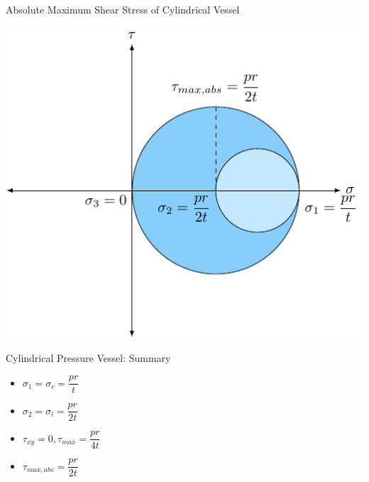 \documentclass[10pt, svgnames]{beamer}
\begin{document}
\begin{frame}[label={sec:org0fff3af}]{Absolute Maximum Shear Stress of Cylindrical Vessel}
\begin{center}
\includegraphics[height=0.8\textheight]{pictures/abs-max-shear-cyl-vessel.pdf}
\end{center}
\end{frame}

\begin{frame}[label={sec:orgfecb9f8}]{Cylindrical Pressure Vessel: Summary}
\begin{itemize}
\item \(\sigma_1 = \sigma_c = \dfrac{pr}{t}\)
\item \(\sigma_2 = \sigma_l = \dfrac{pr}{2t}\)
\item \(\tau_{xy} = 0, \tau_{max} = \dfrac{pr}{4t}\)
\item \(\tau_{max,abs} = \dfrac{pr}{2t}\)
\end{itemize}
\end{frame}
\end{document}
